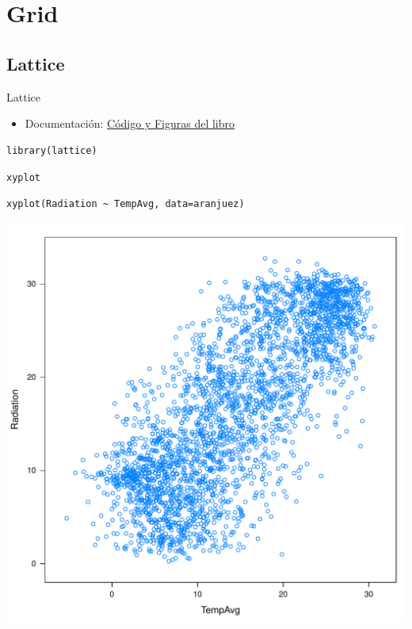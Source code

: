 \documentclass[xcolor={usenames,svgnames,dvipsnames}]{beamer}
\begin{document}
\section{Grid}
\label{sec-2}

\subsection{Lattice}
\label{sec-2-1}

\begin{frame}[fragile,label=sec-2-1-1]{Lattice}
 \begin{itemize}
\item Documentación: \href{http://lmdvr.r-forge.r-project.org/figures/figures.html}{Código y Figuras del libro}
\end{itemize}

\lstset{language=R,numbers=none}
\begin{lstlisting}
library(lattice)
\end{lstlisting}
\end{frame}
\begin{frame}[fragile,label=sec-2-1-2]{\texttt{xyplot}}
 \lstset{language=R,numbers=none}
\begin{lstlisting}
xyplot(Radiation ~ TempAvg, data=aranjuez)
\end{lstlisting}

\includegraphics[width=.9\linewidth]{figs/xyplot.pdf}
\end{frame}
\end{document}
